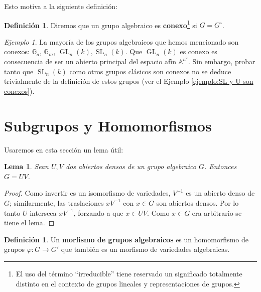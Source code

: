 \documentclass[spanish,10pt]{amsart}
\newtheorem{lemma}[theorem]{Lema}
\theoremstyle{definition}
\newtheorem{definition}[theorem]{Definición}
\theoremstyle{remark}
\newtheorem{example}[theorem]{Ejemplo}
\numberwithin{equation}{section}
\newcommand{\afine}[1]{\mathbb{A}^{#1}}
\begin{document}
Esto motiva a la siguiente definición:
\begin{definition}
Diremos que un grupo algebraico es \textbf{conexo}\footnote{El uso del término ``irreducible'' tiene reservado un significado totalmente distinto en el contexto de grupos lineales y representaciones de grupos.} si $G = G^\circ$.
\end{definition}

\begin{example}
La mayoría de los grupos algebraicos que hemos mencionado son conexos: $\mathbb G_a$, $\mathbb{G}_m$, $\operatorname{GL}_n (k), \operatorname{SL}_n (k)$. Que $\operatorname{GL}_n (k)$ es conexo es consecuencia de ser un abierto principal del espacio afín $\afine {n^2}$. Sin embargo, probar tanto que $\operatorname{SL}_n (k)$ como otros grupos clásicos son conexos no se deduce trivialmente de la definición de estos grupos (ver el Ejemplo \ref{ejemplo:SL y U son conexos}).
\end{example}

\section{Subgrupos y Homomorfismos}

Usaremos en esta sección un lema útil:
\begin{lemma}
Sean $U,V$ dos abiertos densos de un grupo algebraico $G$. Entonces $G = U V$.
\end{lemma}
\begin{proof}
Como invertir es un isomorfismo de variedades, $V^{-1}$ es un abierto denso de $G$; similarmente, las traslaciones $x V^{-1}$ con $x \in G$ son abiertos densos. Por lo tanto $U$ interseca $x V^{-1}$, forzando a que $x \in U V$. Como $x \in G$ era arbitrario se tiene el lema.
\end{proof}

\begin{definition}
Un \textbf{morfismo de grupos algebraicos} es un homomorfismo de grupos $\varphi : G \to G'$ que también es un morfismo de variedades algebraicas.
\end{definition}
\end{document}
